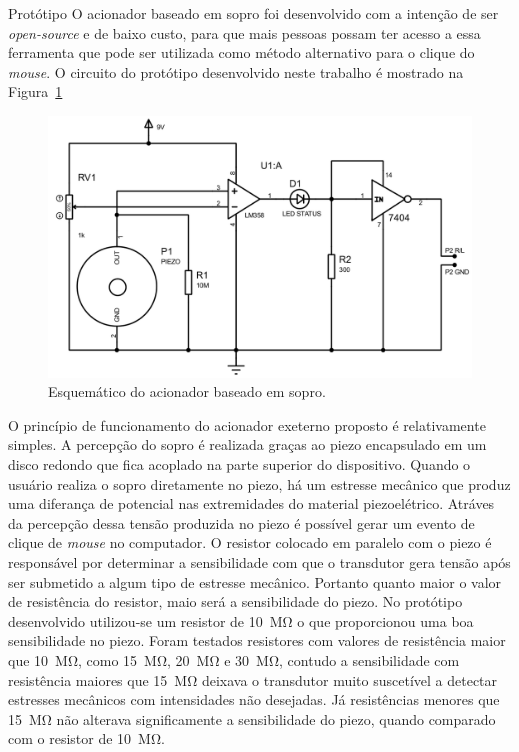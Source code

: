 \begin{chapter}{Protótipo}
O acionador baseado em sopro foi desenvolvido com a intenção de ser
\textit{open-source} e de baixo custo, para que mais pessoas possam ter acesso
a essa ferramenta que pode ser utilizada como método alternativo para o clique
do \textit{mouse}. O circuito do protótipo desenvolvido neste trabalho é mostrado 
na Figura~\ref{fig:circuito}

\begin{figure}[!h]
	\centering
	\begin{minipage}[c]{\textwidth}
	\centering
	\includegraphics[width=1\linewidth]{fig/acionador}
	\caption{Esquemático do acionador baseado em sopro.}
	\label{fig:circuito}
	\end{minipage}
\end{figure} 

O princípio de funcionamento do acionador exeterno proposto é relativamente
simples. A percepção do sopro é realizada graças ao piezo encapsulado em um
disco redondo que fica acoplado na parte superior do dispositivo. Quando o
usuário realiza o sopro diretamente no piezo, há um estresse mecânico que produz
uma diferança de potencial nas extremidades do material piezoelétrico. Atráves
da percepção dessa tensão produzida no piezo é possível gerar um evento de
clique de \textit{mouse} no computador. O resistor colocado em paralelo com o
piezo é responsável por determinar a sensibilidade com que o transdutor gera
tensão após ser submetido a algum tipo de estresse mecânico. Portanto quanto
maior o valor de resistência do resistor, maio será a sensibilidade do piezo.
No protótipo desenvolvido utilizou-se um resistor de 10~M\si{\ohm} o que
proporcionou uma boa sensibilidade no piezo. Foram testados resistores com
valores de resistência maior que 10~M\si{\ohm}, como 15~M\si{\ohm}, 20~M\si{\ohm} e
30~M\si{\ohm}, contudo a sensibilidade com resistência maiores que 15~M\si{\ohm}
deixava o transdutor muito suscetível a detectar estresses mecânicos com
intensidades não desejadas. Já resistências menores que 15~M\si{\ohm} não
alterava significamente a sensibilidade do piezo, quando comparado com o
resistor de 10~M\si{\ohm}. 


\end{chapter}
